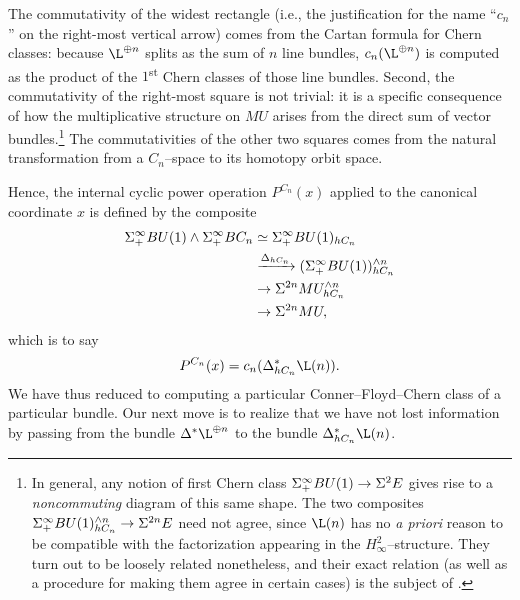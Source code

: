 The commutativity of the widest rectangle (i.e., the justification for the name ``\(c_n\)'' on the right-most vertical arrow) comes from the Cartan formula for Chern classes: because \(\L^{\oplus n}\) splits as the sum of \(n\) line bundles, \(c_n(\L^{\oplus n})\) is computed as the product of the \(1\)\textsuperscript{st} Chern classes of those line bundles.  Second, the commutativity of the right-most square is not trivial: it is a specific consequence of how the multiplicative structure on \(MU\) arises from the direct sum of vector bundles.\footnote{In general, any notion of first Chern class \(\Sigma^\infty_+ BU(1) \to \Sigma^2 E\) gives rise to a \emph{noncommuting} diagram of this same shape.  The two composites \(\Sigma^\infty_+ BU(1)^{\wedge n}_{hC_n} \to \Sigma^{2n} E\) need not agree, since \(\L(n)\) has no \textit{a priori} reason to be compatible with the factorization appearing in the \(H_\infty^2\)--structure.  They turn out to be loosely related nonetheless, and their exact relation (as well as a procedure for making them agree in certain cases) is the subject of .}  The commutativities of the other two squares comes from the natural transformation from a \(C_n\)--space to its homotopy orbit space.

Hence, the internal cyclic power operation \(P^{C_n}(x)\) applied to the canonical coordinate \(x\) is defined by the composite
\begin{align*}
\Sigma^\infty_+ BU(1) \wedge \Sigma^\infty_+ BC_n & \simeq \Sigma^\infty_+ BU(1)_{hC_n} \\
& \xrightarrow{\Delta_{hC_n}} (\Sigma^\infty_+ BU(1))^{\wedge n}_{hC_n} \\
& \to \Sigma^{2n} MU^{\wedge n}_{hC_n} \\
& \to \Sigma^{2n} MU,
\end{align*}
which is to say \[P^{C_n}(x) = c_n(\Delta_{hC_n}^* \L(n)).\]  We have thus reduced to computing a particular Conner--Floyd--Chern class of a particular bundle.  Our next move is to realize that we have not lost information by passing from the bundle \(\Delta^* \L^{\oplus n}\) to the bundle \(\Delta_{hC_n}^* \L(n)\).

